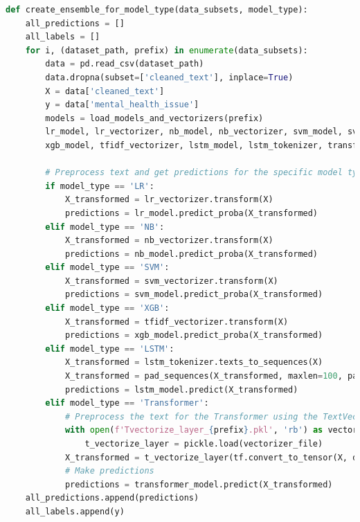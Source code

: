 \begin{tcolorbox}[colback=gray!5!white, colframe=gray!80!black, boxrule=0.5pt, title=Hierarchical Ensemble Model 2] 
    \begin{lstlisting}[language=Python]
def create_ensemble_for_model_type(data_subsets, model_type):
    all_predictions = []
    all_labels = []
    for i, (dataset_path, prefix) in enumerate(data_subsets):
        data = pd.read_csv(dataset_path)
        data.dropna(subset=['cleaned_text'], inplace=True)
        X = data['cleaned_text']
        y = data['mental_health_issue']
        models = load_models_and_vectorizers(prefix)
        lr_model, lr_vectorizer, nb_model, nb_vectorizer, svm_model, svm_vectorizer, \
        xgb_model, tfidf_vectorizer, lstm_model, lstm_tokenizer, transformer_model = models

        # Preprocess text and get predictions for the specific model type
        if model_type == 'LR':
            X_transformed = lr_vectorizer.transform(X)
            predictions = lr_model.predict_proba(X_transformed)
        elif model_type == 'NB':
            X_transformed = nb_vectorizer.transform(X)
            predictions = nb_model.predict_proba(X_transformed)
        elif model_type == 'SVM':
            X_transformed = svm_vectorizer.transform(X)
            predictions = svm_model.predict_proba(X_transformed)
        elif model_type == 'XGB':
            X_transformed = tfidf_vectorizer.transform(X)
            predictions = xgb_model.predict_proba(X_transformed)
        elif model_type == 'LSTM':
            X_transformed = lstm_tokenizer.texts_to_sequences(X)
            X_transformed = pad_sequences(X_transformed, maxlen=100, padding='post', truncating='post')
            predictions = lstm_model.predict(X_transformed)
        elif model_type == 'Transformer':
            # Preprocess the text for the Transformer using the TextVectorization layer
            with open(f'Tvectorize_layer_{prefix}.pkl', 'rb') as vectorizer_file:
                t_vectorize_layer = pickle.load(vectorizer_file)
            X_transformed = t_vectorize_layer(tf.convert_to_tensor(X, dtype=tf.string))
            # Make predictions
            predictions = transformer_model.predict(X_transformed)
    all_predictions.append(predictions)
    all_labels.append(y)
        \end{lstlisting}
    \end{tcolorbox}
